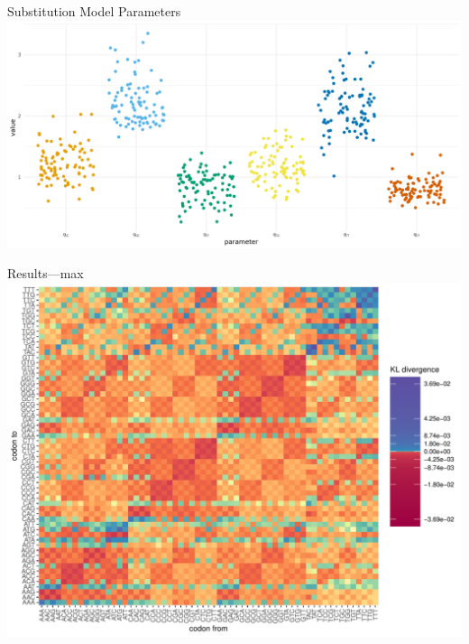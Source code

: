\documentclass[aspectratio=169,font=14pt]{beamer}
\begin{document}
\begin{frame}[c,noframenumbering]{Substitution Model Parameters} %
\centering
\includegraphics[height = 0.8\textheight]{defense/images/sigma_estimates_90_species.png}
\end{frame} %

\begin{frame}{Results---max} %
\centering
\includegraphics[height = 0.9\textheight]{chapter3/figures/heatmaps/tri-max-mg-1.pdf}
\end{frame} %
\end{document}
